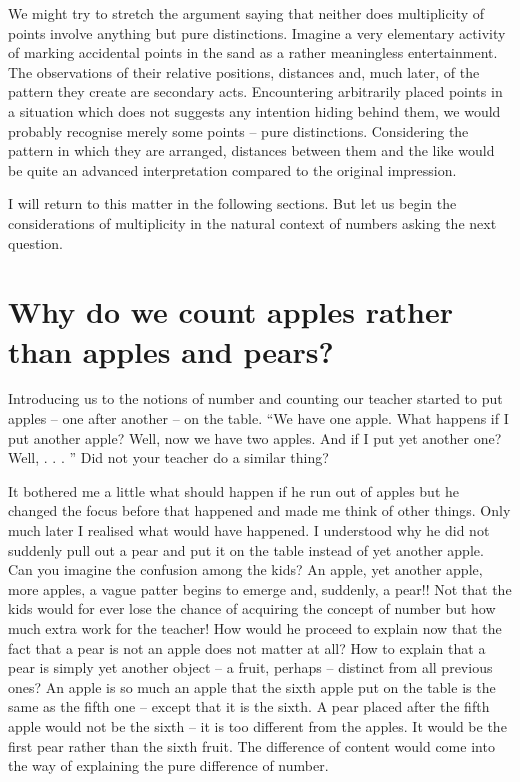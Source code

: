 We might try to stretch the argument saying that neither does multiplicity of points involve anything but pure distinctions. Imagine a very elementary activity of marking accidental points in the sand as a rather meaningless entertainment.
The observations of their relative positions, distances and, much later, of the pattern they create are secondary acts. Encountering arbitrarily placed points in a situation which does not suggests any intention hiding behind them, we would probably recognise merely some points -- pure distinctions. Considering the pattern in which they are arranged, distances between them and the like would be quite an advanced interpretation compared to the original impression.

I will return to this matter in the following sections. But let us begin the considerations of multiplicity in the natural context of numbers asking the next question. 

\section{Why do we count apples rather than apples and pears?}\label{se:apple}
Introducing us to the notions of number and counting our teacher started to put apples -- one after another -- on the table. ``We have one apple. What happens if I put another apple? Well, now we have two apples. And if I put yet another one? Well, . . . '' Did not your teacher do a similar thing? 

It bothered me a little what should happen if he run out of apples but he changed the focus before that happened and made me think of other things. Only much later I realised what would have happened. I understood why he did not suddenly pull out a pear and put it on the table instead of yet another apple. Can you imagine the confusion among the kids? An apple, yet another apple, more apples, a vague patter begins to emerge and, suddenly, a pear!! Not that the kids would for ever lose the chance of acquiring the concept of number but how much extra work for the teacher! How would he proceed to explain now that the fact that a pear is not an apple does not matter at all? How to explain that a pear is simply yet another object -- a fruit, perhaps -- distinct from all previous ones? An apple is so much an apple that the sixth apple put on the table is the same as the fifth one -- except that it is the sixth. A pear placed after the fifth apple would not be the sixth -- it is too different from the apples. It would be the first pear rather than the sixth fruit. The difference of content would come into the way of explaining the pure difference of number.

